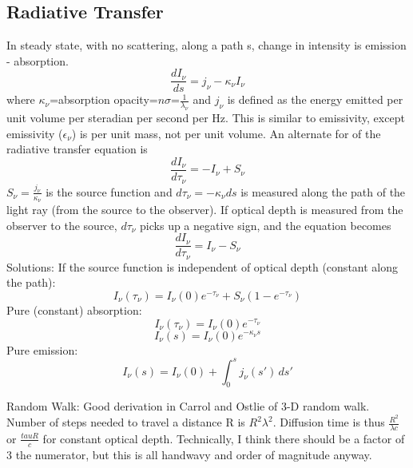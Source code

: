 \subsection{Radiative Transfer}
In steady state, with no scattering, along a path s, change in intensity is emission - absorption.
\begin{displaymath}\frac{dI_{\nu}}{ds}=j_{\nu}-\kappa_{\nu}I_{\nu}\end{displaymath}
where $\kappa_{\nu}$=absorption opacity=$n\sigma$=$\frac{1}{\lambda_{\nu}}$ and $j_{\nu}$ is 
defined as the energy emitted per unit volume per steradian per second per Hz.  This is similar 
to emissivity, except emissivity ($\epsilon_{\nu}$) is per unit mass, not per unit volume.
An alternate for of the radiative transfer equation is 
\begin{displaymath}\frac{dI_{\nu}}{d\tau_{\nu}}=-I_{\nu}+S_{\nu}\end{displaymath}
$S_{\nu}=\frac{j_{\nu}}{\kappa_{\nu}}$ is the source function and $d\tau_{\nu}=-\kappa_{\nu}ds$ 
is measured along the path of the light ray (from the source to the observer).  If optical depth 
is measured from the observer to the source, $d\tau_{\nu}$ picks up a negative sign, and the 
equation becomes
\begin{displaymath}\frac{dI_{\nu}}{d\tau_{\nu}}=I_{\nu}-S_{\nu}\end{displaymath}
Solutions:\newline
If the source function is independent of optical depth (constant along the path):\newline
\begin{displaymath}I_{\nu}(\tau_{\nu})=I_{\nu}(0)e^{-\tau_{\nu}}+S_{\nu}(1-e^{-\tau_{\nu}})\end{displaymath}
Pure (constant) absorption:\newline
\begin{displaymath}I_{\nu}(\tau_{\nu})=I_{\nu}(0)e^{-\tau_{\nu}}\end{displaymath}
\begin{displaymath}I_{\nu}(s)=I_{\nu}(0)e^{-\kappa_{\nu} s}\end{displaymath}
Pure emission:\newline
\begin{displaymath}I_{\nu}(s)=I_{\nu}(0)+\int_0^s j_{\nu}(s')\,ds'\end{displaymath}

Random Walk:\newline
Good derivation in Carrol and Ostlie of 3-D random walk.  Number of steps needed to travel a 
distance R is $R^2\lambda^2$.  Diffusion time is thus $\frac{R^2}{\lambda c}$ or $\frac{tau R}{c}$ 
for constant optical depth.  Technically, I think there should be a factor of 3 the numerator, 
but this is all handwavy and order of magnitude anyway.

